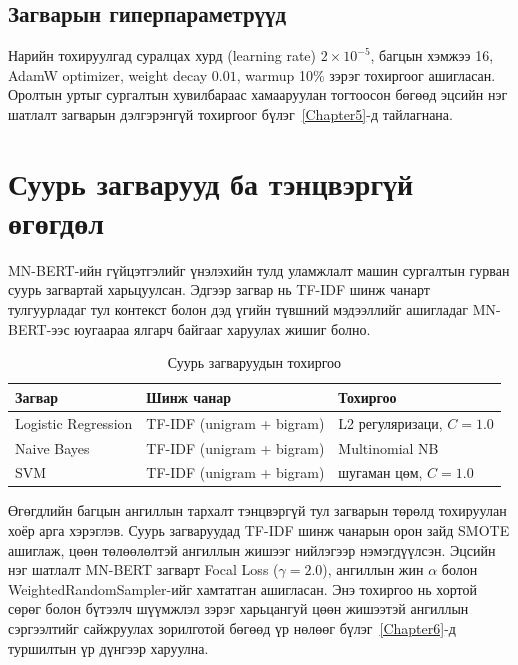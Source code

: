 \subsection{Загварын гиперпараметрүүд}
\label{sec:hyperparams-detail}

Нарийн тохируулгад суралцах хурд (learning rate) $2\times10^{-5}$, багцын
хэмжээ 16, AdamW optimizer, weight decay $0.01$, warmup 10\% зэрэг тохиргоог
ашигласан. Оролтын уртыг сургалтын хувилбараас хамааруулан тогтоосон бөгөөд
эцсийн нэг шатлалт загварын дэлгэрэнгүй тохиргоог бүлэг~\ref{Chapter5}-д
тайлагнана.

\section{Суурь загварууд ба тэнцвэргүй өгөгдөл}
\label{sec:imbalance}

MN-BERT-ийн гүйцэтгэлийг үнэлэхийн тулд уламжлалт машин сургалтын гурван суурь
загвартай харьцуулсан. Эдгээр загвар нь TF-IDF шинж чанарт тулгуурладаг тул
контекст болон дэд үгийн түвшний мэдээллийг ашигладаг MN-BERT-ээс юугаараа
ялгарч байгааг харуулах жишиг болно.

\begin{table}[H]
\centering
\caption{Суурь загваруудын тохиргоо}
\label{tab:baseline-config}
\begin{tabular}{@{}lll@{}}
\toprule
\textbf{Загвар} & \textbf{Шинж чанар} & \textbf{Тохиргоо} \\
\midrule
Logistic Regression & TF-IDF (unigram + bigram) & L2 регуляризаци, $C=1.0$ \\
Naive Bayes         & TF-IDF (unigram + bigram) & Multinomial NB \\
SVM                 & TF-IDF (unigram + bigram) & шугаман цөм, $C=1.0$ \\
\bottomrule
\end{tabular}
\end{table}

Өгөгдлийн багцын ангиллын тархалт тэнцвэргүй тул загварын төрөлд тохируулан
хоёр арга хэрэглэв. Суурь загваруудад TF-IDF шинж чанарын орон зайд SMOTE
ашиглаж, цөөн төлөөлөлтэй ангиллын жишээг нийлэгээр нэмэгдүүлсэн. Эцсийн нэг
шатлалт MN-BERT загварт Focal Loss ($\gamma{=}2.0$), ангиллын жин $\alpha$
болон WeightedRandomSampler-ийг хамтатган ашигласан. Энэ тохиргоо нь хортой
сөрөг болон бүтээлч шүүмжлэл зэрэг харьцангуй цөөн жишээтэй ангиллын
сэргээлтийг сайжруулах зорилготой бөгөөд үр нөлөөг бүлэг~\ref{Chapter6}-д
туршилтын үр дүнгээр харуулна.

